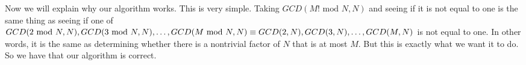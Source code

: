 \documentclass{article}
\begin{document}
\begin{description}
        Now we will explain why our algorithm works. This is very simple.
        Taking $GCD(M! \text{ mod }N, N)$ and seeing if it is not equal to one is
        the same thing as seeing if one of $GCD(2 \text{ mod }N, N), \newline GCD(3 \text{
        mod }N, N),\dots, GCD(M \text{ mod }N,N) \equiv GCD(2,N),
        GCD(3,N), \dots, GCD(M,N)$ is not equal to one. In
        other words, it is the same as determining whether there is a nontrivial
        factor of $N$ that is at most $M$. But this is exactly what we want it
        to do. So we have that our algorithm is correct.
\end{description}
\newpage
\end{document}

